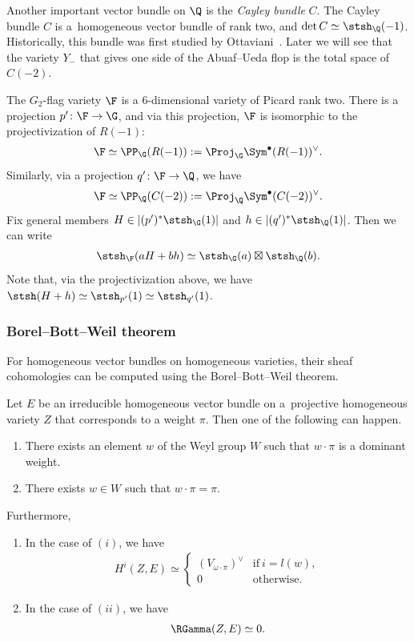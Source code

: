 Another important vector bundle on $\Q$ is the \textit{Cayley bundle} $C$.
The Cayley bundle $C$ is a~homogeneous vector bundle of rank two, and $\det C \simeq \stsh_{\Q}(-1)$.
Historically, this bundle was first studied by Ottaviani~\cite{Ott90}.
Later we will see that the variety $Y_-$ that gives one side of the Abuaf--Ueda flop is the total space of $C(-2)$.

The $G_2$-flag variety $\F$ is a $6$-dimensional variety of Picard rank two.
There is a projection $p'\colon \F \to \G$, and via this projection, $\F$ is isomorphic to the projectivization of $R(-1)$:
\begin{gather*}
\F \simeq \PP_{\G}(R(-1)) := \Proj_{\G} \Sym^{\bullet}(R(-1))^{\vee}.
\end{gather*}
Similarly, via a projection $q'\colon \F \to \Q$, we have
\begin{gather*}
\F \simeq \PP_{\Q}(C(-2)) := \Proj_{\Q} \Sym^{\bullet}(C(-2))^{\vee}.
\end{gather*}
Fix general members $H \in \lvert (p')^*\stsh_{\G}(1) \rvert$ and $h \in \lvert (q')^*\stsh_{\Q}(1) \rvert$.
Then we can write
\begin{gather*}
\stsh_{\F}(aH + bh) \simeq \stsh_{\G}(a) \boxtimes \stsh_{\Q}(b).
\end{gather*}
Note that, via the projectivization above, we have $\stsh(H + h) \simeq \stsh_{p'}(1) \simeq \stsh_{q'}(1)$.

\subsubsection{Borel--Bott--Weil theorem}
For homogeneous vector bundles on homogeneous varieties,
their sheaf cohomologies can be computed using the Borel--Bott--Weil theorem.

\begin{Theorem}
Let $E$ be an irreducible homogeneous vector bundle on a~pro\-jec\-tive homogeneous variety $Z$ that corresponds to a weight $\pi$.
Then one of the following can happen.
\begin{enumerate}\itemsep=0pt
\item[$(i)$] There exists an element $w$ of the Weyl group $W$ such that
$w \cdot \pi$ is a dominant weight.
\item[$(ii)$] There exists $w \in W$ such that
$w \cdot \pi = \pi$.
\end{enumerate}
Furthermore,
\begin{enumerate}\itemsep=0pt
\item[$(I)$] In the case of $(i)$, we have
\begin{align*}
H^i(Z, E) \simeq \begin{cases}
(V_{\omega \cdot \pi})^{\vee} & \text{if} \ i = l(w), \\
0 & \text{otherwise}.
\end{cases}
\end{align*}
\item[$(II)$] In the case of $(ii)$, we have
\begin{gather*}
\RGamma(Z, E) \simeq 0.
\end{gather*}
\end{enumerate}
\end{Theorem}


